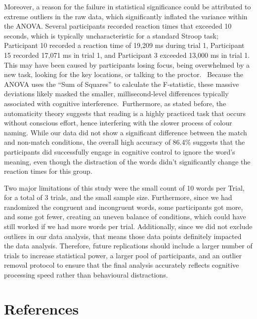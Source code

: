 \documentclass[
  authoryear,
  preprint]{elsarticle}
\begin{document}
Moreover, a reason for the failure in statistical significance could be
attributed to extreme outliers in the raw data, which significantly
inflated the variance within the ANOVA. Several participants recorded
reaction times that exceeded 10 seconds, which is typically
uncharacteristic for a standard Stroop task; Participant 10 recorded a
reaction time of 19,209 ms during trial 1, Participant 15 recorded
17,071 ms in trial 1, and Participant 3 exceeded 13,000 ms in trial 1.
This may have been caused by participants losing focus, being
overwhelmed by a new task, looking for the key locations, or talking to
the proctor.~ Because the ANOVA uses the ``Sum of Squares'' to calculate
the F-statistic, these massive deviations likely masked the smaller,
millisecond-level differences typically associated with cognitive
interference.~Furthermore, as stated before, the automaticity theory
suggests that reading is a highly practiced task that occurs without
conscious effort, hence interfering with the slower process of colour
naming. While our data did not show a significant difference between the
match and non-match conditions, the overall high accuracy of 86.4\%
suggests that the participants did successfully engage in cognitive
control to ignore the word's meaning, even though the distraction of the
words didn't significantly change the reaction times for this group.

Two major limitations of this study were the small count of 10 words per
Trial, for a total of 3 trials, and the small sample size. Furthermore,
since we had randomized the congruent and incongruent words, some
participants got more, and some got fewer, creating an uneven balance of
conditions, which could have still worked if we had more words per
trial. Additionally, since we did not exclude outliers in our data
analysis, that means those data points definitely impacted the data
analysis. Therefore, future replications should include a larger number
of trials to increase statistical power, a larger pool of participants,
and an outlier removal protocol to ensure that the final analysis
accurately reflects cognitive processing speed rather than behavioural
distractions.

\section*{References}\label{references}

\renewcommand{\bibsection}{}

\end{document}
